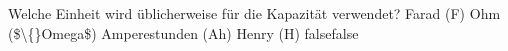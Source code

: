     {Welche Einheit wird üblicherweise für die Kapazität verwendet?}
    {Farad (F)}
    {Ohm (\$\textbackslash\{\}Omega\$)}
    {Amperestunden (Ah)}
    {Henry (H)}
    {false}{false}